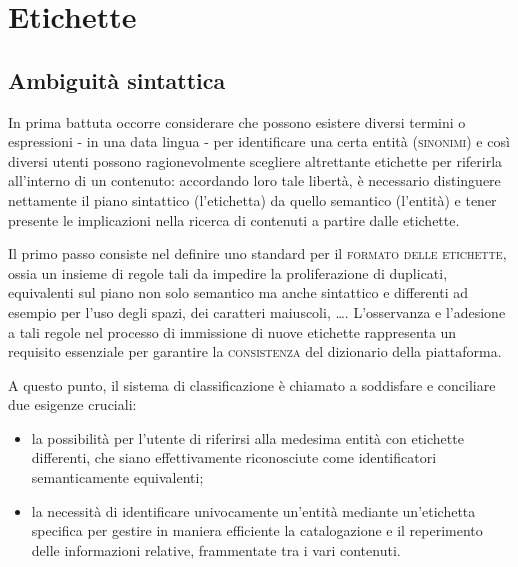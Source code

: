 \documentclass[10pt,a4paper,headinclude,footinclude,hidelinks]{scrreprt} %
\begin{document}
	\section{Etichette}
	\label{sec:stage:design:etichette}

	\subsection{Ambiguità sintattica}
	In prima battuta occorre considerare che possono esistere diversi termini o espressioni - in una data lingua - per identificare una certa entità (\textsc{sinonimi}) e così diversi utenti possono ragionevolmente scegliere altrettante etichette per riferirla all'interno di un contenuto: accordando loro tale libertà, è necessario distinguere nettamente il piano sintattico (l'etichetta) da quello semantico (l'entità) e tener presente le implicazioni nella ricerca di contenuti a partire dalle etichette.

	Il primo passo consiste nel definire uno standard per il \textsc{formato delle etichette}, ossia un insieme di regole tali da impedire la proliferazione di duplicati, equivalenti sul piano non solo semantico ma anche sintattico e differenti ad esempio per l'uso degli spazi, dei caratteri maiuscoli, \ldots. L'osservanza e l'adesione a tali regole nel processo di immissione di nuove etichette rappresenta un requisito essenziale per garantire la \textsc{consistenza} del dizionario della piattaforma.

	A questo punto, il sistema di classificazione è chiamato a soddisfare e conciliare due esigenze cruciali:
	\begin{itemize}
	\item la possibilità per l'utente di riferirsi alla medesima entità con etichette differenti, che siano effettivamente riconosciute come identificatori semanticamente equivalenti;
	\item la necessità di identificare univocamente un'entità mediante un'etichetta specifica per gestire in maniera efficiente la catalogazione e il reperimento delle informazioni relative, frammentate tra i vari contenuti.
	\end{itemize}

\end{document}
